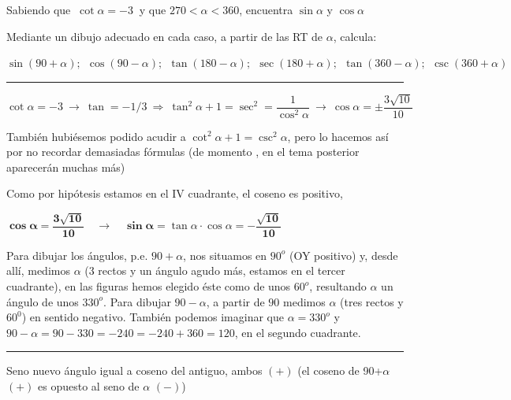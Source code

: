 \begin{miejercicio}

Sabiendo que $\ \cot \alpha=-3\ $ y que $270<\alpha<360$, encuentra $\sin \alpha$ y $\cos \alpha$

\vspace{2mm} Mediante un dibujo adecuado en cada caso, a partir de las RT de $\alpha$, calcula:

\vspace{2mm} $\sin(90+\alpha);\ \ \cos(90-\alpha);\ \ \tan(180-\alpha);\ \ \sec(180+\alpha);\ \ \tan(360-\alpha);\ \ \csc(360+\alpha)$ 

\rule{250pt}{0.1pt}	

\vspace{2mm} $\cot \alpha=-3 \ \to \ \tan=-1/3 \ \Rightarrow \ \tan^2 \alpha+1=\sec^2=\dfrac{1}{\cos^2 \alpha} \ \to \  \cos \alpha=\pm \dfrac{3\sqrt{10}}{10}$

\vspace{2mm} \begin{footnotesize} \textcolor{gris}{También hubiésemos podido acudir a $\cot^2 \alpha+1=\csc^2 \alpha$, pero lo hacemos así por no recordar demasiadas fórmulas (de momento \frownie{}, en el tema posterior aparecerán muchas más)} \end{footnotesize}

\vspace{2mm} Como por hipótesis estamos en el IV cuadrante, el coseno es positivo,

$\boldsymbol{\cos \alpha= \dfrac{3\sqrt{10}}{10}} \quad \to \quad \boldsymbol{\sin \alpha}= \tan \alpha \cdot \cos \alpha =\boldsymbol{-\dfrac{\sqrt{10}}{10}}$

\vspace{2mm}
Para dibujar los ángulos, p.e. $90+\alpha$, nos situamos en $90^o$ (OY positivo) y, desde allí, medimos  $\alpha$ (3 rectos y un ángulo agudo más, estamos en el tercer cuadrante), en las figuras hemos elegido éste como de unos $60^o$, resultando $\alpha$ un ángulo de unos $330^o$. Para dibujar $90-\alpha$, a partir de $90$ medimos $\alpha$ (tres rectos y $60^0$) en sentido negativo. También podemos imaginar que $\alpha=330^o$ y $90-\alpha=90-330=-240=-240+360=120$, en el segundo cuadrante.

\vspace{-6mm}
\begin{center} \rule{300pt}{0.1pt} \end{center}

\begin{multicols}{2}
Seno nuevo ángulo igual a coseno del antiguo, ambos $(+)$ (el coseno de 90+$\alpha$ $(+)$ es opuesto al seno de $\alpha$ $(-)$)


\end{multicols}
\end{miejercicio}
